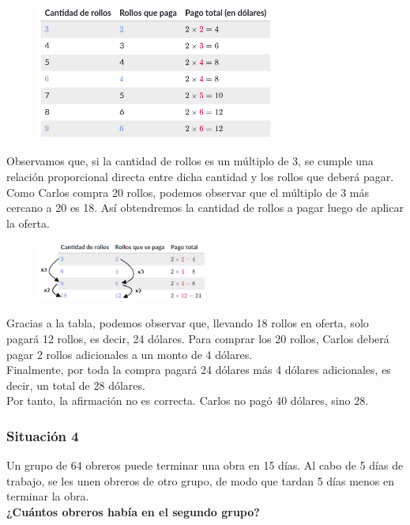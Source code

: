 \documentclass[11pt]{book}
\begin{document}
\begin{figure}[H]
  \centering
  \includegraphics[width=0.7\textwidth]{./Unidad 2/Images/tableS8L102.png}
\end{figure}

Observamos que, si la cantidad de rollos es un múltiplo de 3, se cumple una relación proporcional directa entre dicha cantidad y los rollos que deberá pagar.\\

Como Carlos compra 20 rollos, podemos observar que el múltiplo de 3 más cercano a 20 es 18. Así obtendremos la cantidad de rollos a pagar luego de aplicar la oferta.\\

\begin{figure}[H]
  \centering
  \includegraphics[width=0.5\textwidth]{./Unidad 2/Images/tableS8L101.png}
\end{figure}

Gracias a la tabla, podemos observar que, llevando 18 rollos en oferta, solo pagará 12 rollos, es decir, 24 dólares. Para comprar los 20 rollos, Carlos deberá pagar 2 rollos adicionales a un monto de 4 dólares.\\

Finalmente, por toda la compra pagará 24 dólares más 4 dólares adicionales, es decir, un total de 28 dólares.\\

Por tanto, la afirmación no es correcta. Carlos no pagó 40 dólares, sino 28.

\subsubsection{Situación 4}
Un grupo de 64 obreros puede terminar una obra en 15 días. Al cabo de 5 días de trabajo, se les unen obreros de otro grupo, de modo que tardan 5 días menos en terminar la obra.\\
\textbf{¿Cuántos obreros había en el segundo grupo?}\\
\end{document}
